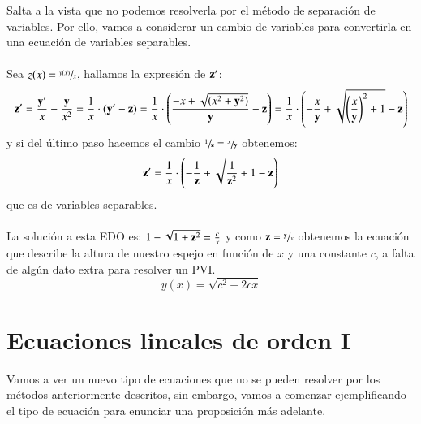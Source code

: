 \begin{eg}
$$    $$
    Salta a la vista que no podemos resolverla por el método de separación de variables. Por ello, vamos a considerar un cambio de variables para convertirla en una ecuación de variables separables.\\\\
    Sea $z(x) = \sfrac{y(x)}{x}$, hallamos la expresión de $\mathbf{z'}$:
    $$
        \mathbf{z'} = \frac{\mathbf{y'}}{x} - \frac{\mathbf{y}}{x^2} = \frac{1}{x} \cdot (\mathbf{y'} - \mathbf{z}) = \frac{1}{x} \cdot \left(\frac{-x + \sqrt{(x^2+\mathbf{y}^2)}}{\mathbf{y}} - \mathbf{z}\right) = \frac{1}{x} \cdot \left(-\frac{x}{\mathbf{y}} +\sqrt{\left(\frac{x}{\mathbf{y}}\right)^2+1} -\mathbf{z}\right)
    $$
    y si del último paso hacemos el cambio $\sfrac{1}{\mathbf{z}} = \sfrac{x}{\mathbf{y}}$ obtenemos:
    $$
        \mathbf{z'} = \frac{1}{x} \cdot \left(-\frac{1}{\mathbf{z}} + \sqrt{\frac{1}{\mathbf{z}^2}+1} - \mathbf{z} \right)
    $$
    que es de variables separables.\\\\
    La solución a esta EDO es: $1 - \sqrt{1+\mathbf{z}^2} = \frac{c}{x}$ y como $\mathbf{z} = \sfrac{\mathbf{y}}{x}$ obtenemos la ecuación que describe la altura de nuestro espejo en función de $x$ y una constante $c$, a falta de algún dato extra para resolver un PVI.
    $$
        y(x) = \sqrt{c^2 + 2cx}
    $$
\end{eg}

\section{Ecuaciones lineales de orden I}
Vamos a ver un nuevo tipo de ecuaciones que no se pueden resolver por los métodos anteriormente descritos, sin embargo, vamos a comenzar ejemplificando el tipo de ecuación para enunciar una proposición más adelante.

